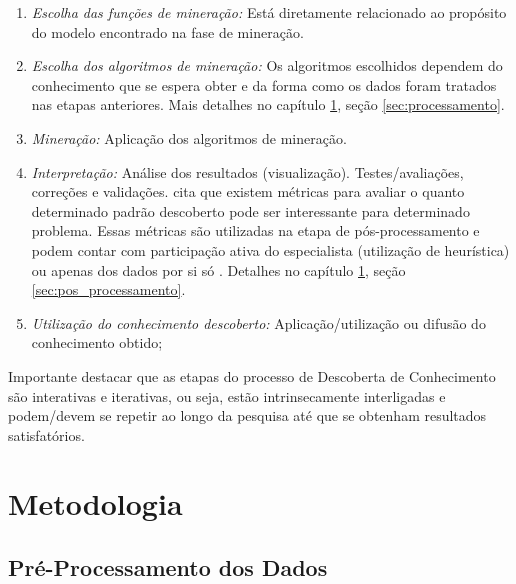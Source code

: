 \documentclass[tcc2]{classe_uftex/uftex}
\begin{document}
\begin{enumerate}
        \item \emph{Escolha das funções de mineração:}
        Está diretamente relacionado ao propósito do modelo encontrado na fase de mineração.
        \item \emph{Escolha dos algoritmos de mineração:}
        Os algoritmos escolhidos dependem do conhecimento que se espera obter e da forma como os dados foram tratados nas etapas anteriores. Mais detalhes no capítulo \ref{cap:metodologia}, seção \ref{sec:processamento}.
        \item \emph{Mineração:}
        Aplicação dos algoritmos de mineração.
        \item \emph{Interpretação:}
        Análise dos resultados (visualização). Testes/avaliações, correções e validações.  cita que existem métricas para avaliar o quanto determinado padrão descoberto pode ser interessante para determinado problema. Essas métricas são utilizadas na etapa de pós-processamento e podem contar com participação ativa do especialista (utilização de heurística) ou apenas dos dados por si só \cite{2008:Calil}. Detalhes no capítulo \ref{cap:metodologia}, seção \ref{sec:pos_processamento}.
        \item \emph{Utilização do conhecimento descoberto:}
        Aplicação/utilização ou difusão do conhecimento obtido;
    \end{enumerate}
    
Importante destacar que as etapas do processo de Descoberta de Conhecimento são interativas e iterativas, ou seja, estão intrinsecamente interligadas e podem/devem se repetir ao longo da pesquisa até que se obtenham resultados satisfatórios.%


\chapter{Metodologia}
\label{cap:metodologia}

\section{Pré-Processamento dos Dados}
\label{sec:pre_processamento}
\end{document}
